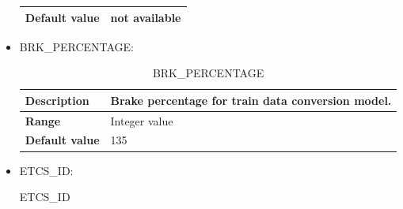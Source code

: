 \documentclass{template/openetcs}
\begin{document}
\begin{itemize}
\begin{longtable}{|l|l|}
				\hline
				
					\begin{minipage}[t]{0.22\linewidth} \textbf{Default value}	\end{minipage} 
				&	\begin{minipage}[t]{0.78\linewidth} not available \end{minipage} \\
				
				\hline
				
			\end{longtable}
			
		\item BRK\_PERCENTAGE:
													
			\begin{longtable}{|l|l|}
				\caption{BRK\_PERCENTAGE}\\ 
				\hline
				
					\begin{minipage}[t]{0.22\linewidth} \textbf{Description}	\end{minipage} 
				&	\begin{minipage}[t]{0.78\linewidth} Brake percentage for train data conversion model. \end{minipage} \\
				
				\hline
																																									
					\begin{minipage}[t]{0.22\linewidth} \textbf{Range}	\end{minipage} 
				&	\begin{minipage}[t]{0.78\linewidth} Integer value \end{minipage} \\
				
				\hline
				
					\begin{minipage}[t]{0.22\linewidth} \textbf{Default value}	\end{minipage} 
				&	\begin{minipage}[t]{0.78\linewidth} 135 \end{minipage} \\
				
				\hline
				
			\end{longtable}
			
		\item ETCS\_ID:
															
			\begin{longtable}{|l|l|}
				\caption{ETCS\_ID}\\ 
				\hline
				

\end{longtable}
\end{itemize}
\end{document}
